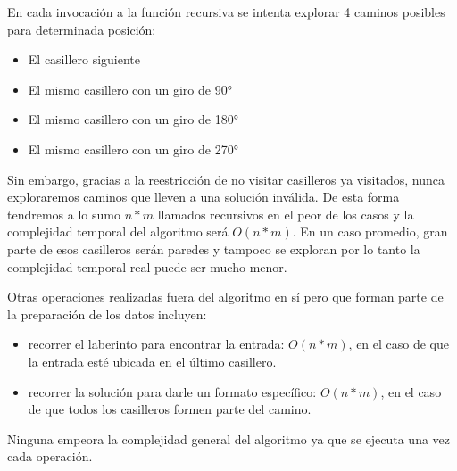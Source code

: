 En cada invocación a la función recursiva se intenta explorar 4 caminos posibles para determinada posición:
\begin{itemize}
    \item El casillero siguiente
    \item El mismo casillero con un giro de 90°
    \item El mismo casillero con un giro de 180°
    \item El mismo casillero con un giro de 270°
\end{itemize}

Sin embargo, gracias a la reestricción de no visitar casilleros ya visitados, nunca exploraremos caminos que lleven a una solución inválida. De esta forma tendremos a lo sumo $n * m$ llamados recursivos en el peor de los casos y la complejidad temporal del algoritmo será $O(n*m)$. En un caso promedio, gran parte de esos casilleros serán paredes y tampoco se exploran por lo tanto la complejidad temporal real puede ser mucho menor.

Otras operaciones realizadas fuera del algoritmo en sí pero que forman parte de la preparación de los datos incluyen:
\begin{itemize}
    \item recorrer el laberinto para encontrar la entrada: $O(n*m)$, en el caso de que la entrada esté ubicada en el último casillero.
    \item recorrer la solución para darle un formato específico: $O(n*m)$, en el caso de que todos los casilleros formen parte del camino.
\end{itemize}
    Ninguna empeora la complejidad general del algoritmo ya que se ejecuta una vez cada operación.
    


